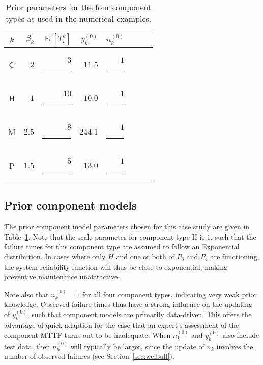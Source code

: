 \documentclass[authoryear]{elsarticle}
\newcommand{\uz}{^{(0)}} %
\newcommand{\E}{\operatorname{E}}
\def\ykz{y\uz_k}
\def\nkz{n\uz_k}
\begin{document}
\begin{table}
\centering
\begin{tabular}{crrrrrrr}
  \toprule
$k$ & $\beta_k$ & $\E[T_i^k]$ & $\ykz$ & $\nkz$ \\
  \midrule
C & $2  $ & $ 3$\rule{1.5ex}{0ex} & $ 11.5$ & $1$\rule{1ex}{0ex} \\
H & $1  $ & $10$\rule{1.5ex}{0ex} & $ 10.0$ & $1$\rule{1ex}{0ex} \\
M & $2.5$ & $ 8$\rule{1.5ex}{0ex} & $244.1$ & $1$\rule{1ex}{0ex} \\
P & $1.5$ & $ 5$\rule{1.5ex}{0ex} & $ 13.0$ & $1$\rule{1ex}{0ex} \\
  \bottomrule
\end{tabular}
\caption{Prior parameters for the four component types as used in the numerical examples.}
\label{tab:priorparams}
\end{table}


\subsection{Prior component models}
\label{sec:ex-prior}

The prior component model parameters chosen for this case study
are given in Table~\ref{tab:priorparams}.
Note that the scale parameter for component type H is $1$,
such that the failure times for this component type are assumed to follow an Exponential distribution.
In cases where only $H$ and one or both of $P_3$ and $P_4$ are functioning,
the system reliability function will thus be close to exponential,
making preventive maintenance unattractive.

Note also that $\nkz = 1$ for all four component types,
indicating very weak prior knowledge.
Observed failure times thus have a strong influence on the updating of $\ykz$,
such that component models are primarily data-driven.
This offers the advantage of quick adaption
for the case that an expert's assessment of the component MTTF turns out to be inadequate.
When $\nkz$ and $\ykz$ also include test data,
then $\nkz$ will typically be larger,
since the update of $n_k$ involves the number of observed failures
(see Section~\ref{sec:weibull}).
\end{document}
